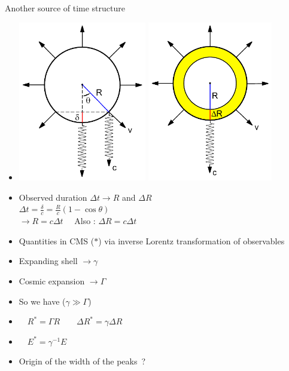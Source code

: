 \Tr
\begin{center}
{\red Another source of time structure}
\end{center}

\vspace*{0.5cm}

\begin{itemize}
\item[] \includegraphics[keepaspectratio,height=7cm]{grb-shell1}
        \includegraphics[keepaspectratio,height=7cm]{grb-shell2}
\item Observed duration $\Delta t \rightarrow R$ and $\Delta R$\\[2mm]
      $\displaystyle \Delta t=\frac{\delta}{c}=\frac{R}{c}\left(1-\cos\theta\right)$\\[2mm]
      $\rightarrow R=c\Delta t \quad$ Also : $\Delta R=c\Delta t$
\end{itemize}

\newpage

\vspace*{2.5cm}

\begin{itemize}
\item Quantities in CMS ($\ast$) via inverse Lorentz transformation of observables
\item[] Expanding shell $\rightarrow \gamma$
\item[] Cosmic expansion $\rightarrow \Gamma$
\item So we have ($\gamma \gg \Gamma$)
\item[] $\quad R^{\ast}=\Gamma R \qquad \Delta R^{\ast}=\gamma \Delta R$
\item[] $\quad E^{\ast}=\gamma^{-1} E$
\item {\blue Origin of the width of the peaks~?}
\end{itemize}


